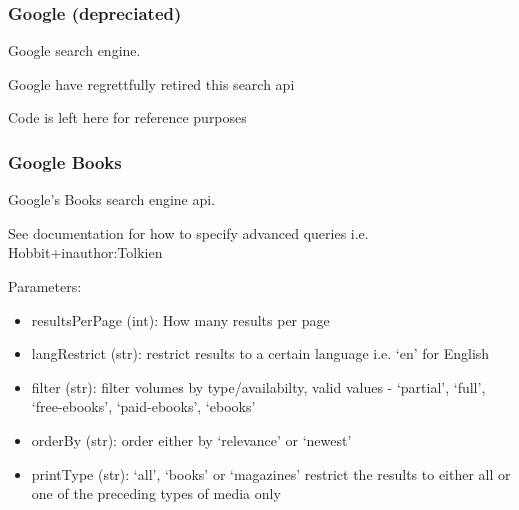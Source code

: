 \documentclass[letterpaper,10pt,english]{sphinxmanual}
\begin{document}
\subsubsection{Google (depreciated)}
\label{api2.0:google-depreciated}

\begin{fulllineitems}
\label{api2.0:puppy.search.engine.Google}
Google search engine.

Google have regrettfully retired this search api

Code is left here for reference purposes

\end{fulllineitems}



\subsubsection{Google Books}
\label{api2.0:google-books}

\begin{fulllineitems}
\label{api2.0:puppy.search.engine.GoogleBooks}
Google's Books search engine api.

See documentation for how to specify advanced queries i.e. Hobbit+inauthor:Tolkien

Parameters:
\begin{itemize}
\item {} 
resultsPerPage (int): How many results per page

\item {} 
langRestrict (str): restrict results to a certain language i.e. `en' for English

\item {} 
filter (str): filter volumes by type/availabilty, valid values - `partial', `full', `free-ebooks', `paid-ebooks', `ebooks'

\item {} 
orderBy (str): order either by `relevance' or `newest'

\item {} 
printType (str): `all', `books' or `magazines' restrict the results to either all or one of the preceding types of media only

\end{itemize}

\end{fulllineitems}
\end{document}
